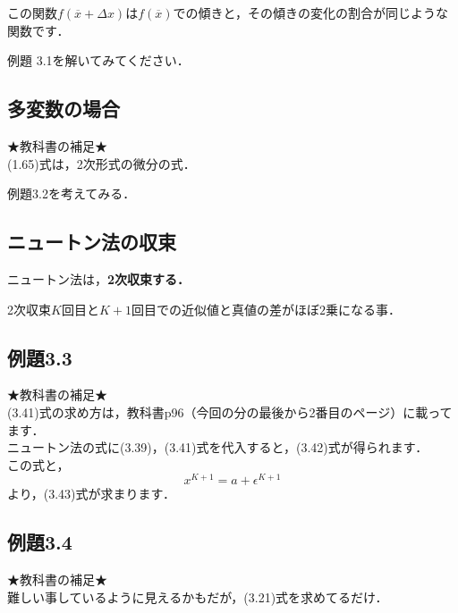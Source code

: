 \documentclass[11pt,a4paper]{jsarticle}
\newcommand{\itemb}[2]{\begin{itembox}[l]{#1}$#2$\end{itembox}}
\newcommand{\ov}[1]{\overline{#1}}
\newcommand{\eq}[1]{ \begin{equation}#1 \end{equation}}
\begin{document}
この関数$f(\ov{x}+\Delta x) $は$f(\ov{x}) $での傾きと，その傾きの変化の割合が同じような関数です．

例題 3.1を解いてみてください．

\subsection{多変数の場合}
★教科書の補足★\\
(1.65)式は，2次形式の微分の式．

例題3.2を考えてみる．

\subsection{ニュートン法の収束}

ニュートン法は，\bf{2次収束}する．
\itemb{2次収束}{
	K回目とK+1回目での近似値と真値の差がほぼ2乗になる事．
}
\subsection{例題3.3}
★教科書の補足★\\
(3.41)式の求め方は，教科書p96（今回の分の最後から2番目のページ）に載ってます．\\
ニュートン法の式に(3.39)，(3.41)式を代入すると，(3.42)式が得られます．\\
この式と，
\eq{
	x^{K+1} = a + \epsilon^{K+1}   
}
より，(3.43)式が求まります．
\subsection{例題3.4}
★教科書の補足★\\
難しい事しているように見えるかもだが，(3.21)式を求めてるだけ．
\end{document}
